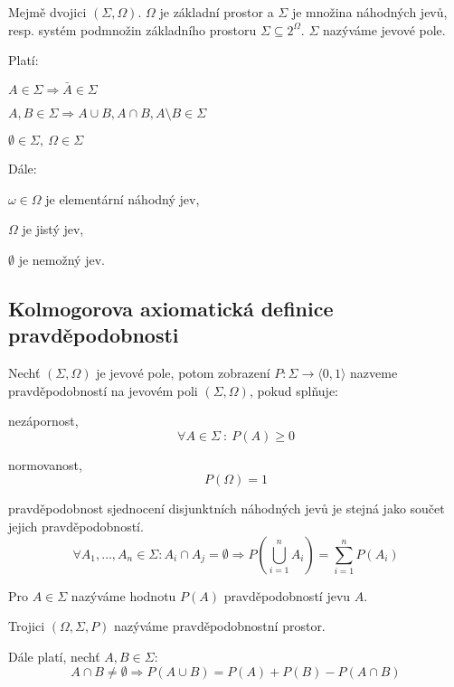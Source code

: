 \begin{compactitem}
    \item Mejmě dvojici $(\Sigma, \Omega)$. $\Omega$ je základní prostor a $\Sigma$ je množina náhodných jevů, resp. systém podmnožin základního prostoru $\Sigma \subseteq 2^{\Omega}$. $\Sigma$ nazýváme jevové pole.

    \item Platí: \begin{compactenum}
        \item $ A \in \Sigma \Rightarrow \bar{A} \in \Sigma $
        \item $ A, B \in \Sigma \Rightarrow A \cup B, A \cap B, A \setminus B \in \Sigma $
        \item $ \emptyset \in \Sigma,~ \Omega \in \Sigma $
    \end{compactenum}

    \item Dále: \begin{compactitem}
        \item $\omega \in \Omega$ je elementární náhodný jev,
        \item $\Omega$ je jistý jev,
        \item $\emptyset$ je nemožný jev.
    \end{compactitem}

\end{compactitem}

\subsection{Kolmogorova axiomatická definice pravděpodobnosti}

\begin{compactitem}
    \item Nechť $(\Sigma, \Omega)$ je jevové pole, potom zobrazení $P : \Sigma \rightarrow \langle 0, 1 \rangle$ nazveme pravděpodobností na jevovém poli $(\Sigma, \Omega)$, pokud splňuje: \begin{compactitem}
        \item nezápornost,
        $$\forall A \in \Sigma ~:~ P(A) \geq 0$$
        \item normovanost,
        $$ P(\Omega) = 1 $$
        \item pravděpodobnost sjednocení disjunktních náhodných jevů je stejná jako součet jejich pravděpodobností.
        $$ \forall A_1, \ldots, A_n \in \Sigma : A_i \cap A_j = \emptyset \Rightarrow P \left( \bigcup_{i=1}^n A_i \right) = \sum_{i=1}^n P(A_i) $$
    \end{compactitem}

    \item Pro $A \in \Sigma$ nazýváme hodnotu $P(A)$ pravděpodobností jevu $A$.

    \item Trojici $ (\Omega, \Sigma, P) $ nazýváme pravděpodobnostní prostor.

    \item Dále platí, nechť $A, B \in \Sigma$:
    $$ A \cap B \not= \emptyset \Rightarrow P(A \cup B) = P(A) + P(B) - P(A \cap B) $$
\end{compactitem}

